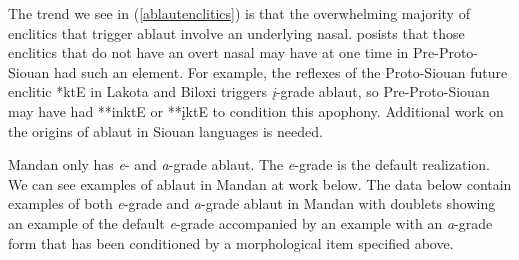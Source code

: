 The trend we see in (\ref{ablautenclitics}) is that the overwhelming majority of enclitics that trigger ablaut involve an underlying nasal. \citet[28]{rood1983} posists that those enclitics that do not have an overt nasal may have at one time in Pre-Proto-Siouan had such an element. For example, the reflexes of the Proto-Siouan future enclitic *ktE in Lakota and Biloxi triggers \textit{į}-grade ablaut, so Pre-Proto-Siouan may have had **inktE or **įktE to condition this apophony. %
Additional work on the origins of ablaut in Siouan languages is needed.

Mandan only has \textit{e}- and \textit{a}-grade ablaut. The \textit{e}-grade is the default realization. We can see examples of ablaut in Mandan at work below. The data below contain examples of both \textit{e}-grade and \textit{a}-grade ablaut in Mandan with doublets showing an example of the default \textit{e}-grade accompanied by an example with an \textit{a}-grade form that has been conditioned by a morphological item specified above.

